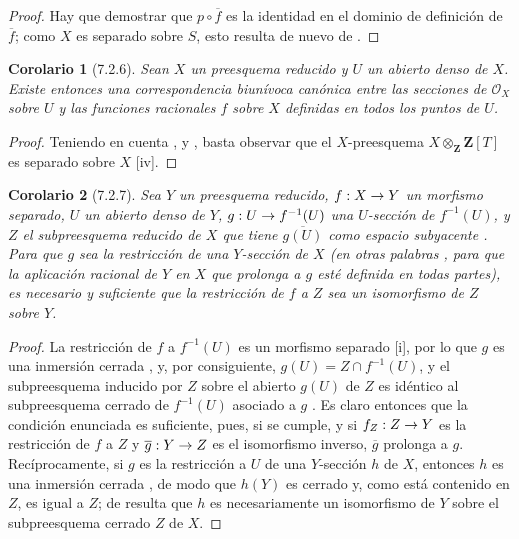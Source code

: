 \documentclass[oneside]{amsart}
\theoremstyle{ega-env-style}
\theoremstyle{ega-thm-env-style}
\newtheorem*{corollary}{Corolario}
\theoremstyle{ega-defn-env-style}
\renewcommand{\to}{\mathchoice{\longrightarrow}{\rightarrow}{\rightarrow}{\rightarrow}}
\newcommand{\oldpage}[2][]{{\marginnote{\normalfont{\textbf{#1}~|~#2}}}\ignorespaces}
\let\EGAOriginalLabel\label
\renewcommand{\label}[1]{\phantomsection\EGAOriginalLabel{#1}}
\begin{document}
\oldpage[I]{160}
\begin{proof}
Hay que demostrar que $p\circ\overline f$ es la identidad en el dominio de definición de $\overline f$; como $X$ es separado sobre $S$, esto resulta de nuevo de .
\end{proof}

\begin{corollary}[7.2.6]
\label{I.7.2.6}
Sean $X$ un preesquema reducido y $U$ un abierto denso de $X$.
Existe entonces una correspondencia biunívoca canónica entre las secciones de $\mathscr{O}_X$ sobre $U$ y las funciones racionales $f$ sobre $X$ definidas en todos los puntos de $U$.
\end{corollary}

\begin{proof}
Teniendo en cuenta ,  y , basta observar que el $X$-preesquema $X\otimes_{\mathbf Z}\mathbf Z[T]$ es separado sobre $X$ [iv].
\end{proof}

\begin{corollary}[7.2.7]
\label{I.7.2.7}
Sea $Y$ un preesquema reducido, $f:X\to Y$ un morfismo separado, $U$ un abierto denso de $Y$, $g:U\to f^{-1}(U)$ una $U$-sección de $f^{-1}(U)$, y $Z$ el subpreesquema reducido de $X$ que tiene $\overline{g(U)}$ como espacio subyacente .
Para que $g$ sea la restricción de una $Y$-sección de $X$ \textup{(en otras palabras , para que la aplicación racional de $Y$ en $X$ que prolonga a $g$ esté definida en todas partes)}, es necesario y suficiente que la restricción de $f$ a $Z$ sea un isomorfismo de $Z$ sobre $Y$.
\end{corollary}

\begin{proof}
La restricción de $f$ a $f^{-1}(U)$ es un morfismo separado [i], por lo que $g$ es una inmersión cerrada , y, por consiguiente, $g(U)=Z\cap f^{-1}(U)$, y el subpreesquema inducido por $Z$ sobre el abierto $g(U)$ de $Z$ es idéntico al subpreesquema cerrado de $f^{-1}(U)$ asociado a $g$ .
Es claro entonces que la condición enunciada es suficiente, pues, si se cumple, y si $f_Z:Z\to Y$ es la restricción de $f$ a $Z$ y $\overline g:Y\to Z$ es el isomorfismo inverso, $\overline g$ prolonga a $g$.
Recíprocamente, si $g$ es la restricción a $U$ de una $Y$-sección $h$ de $X$, entonces $h$ es una inmersión cerrada , de modo que $h(Y)$ es cerrado y, como está contenido en $Z$, es igual a $Z$; de  resulta que $h$ es necesariamente un isomorfismo de $Y$ sobre el subpreesquema cerrado $Z$ de $X$.
\end{proof}
\end{document}
